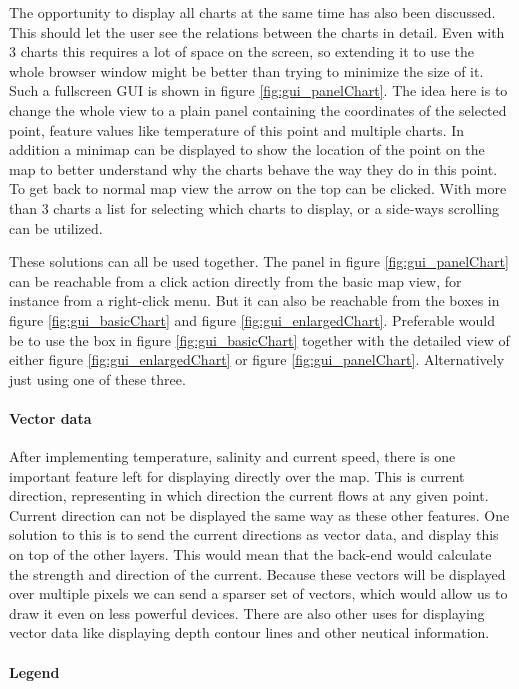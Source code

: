 \documentclass[11pt,a4paper,titlepage,oneside]{report}
\begin{document}
The opportunity to display all charts at the same time has also been discussed. This should let the user see the relations between the charts in detail. Even with 3 charts this requires a lot of space on the screen, so extending it to use the whole browser window might be better than trying to minimize the size of it. Such a fullscreen \gls{GUI} is shown in figure \ref{fig:gui_panelChart}. The idea here is to change the whole view to a plain panel containing the coordinates of the selected point, feature values like temperature of this point and multiple charts. In addition a minimap can be displayed to show the location of the point on the map to better understand why the charts behave the way they do in this point. To get back to normal map view the arrow on the top can be clicked. With more than 3 charts a list for selecting which charts to display, or a side-ways scrolling can be utilized.

These solutions can all be used together. The panel in figure \ref{fig:gui_panelChart} can be reachable from a click action directly from the basic map view, for instance from a right-click menu. But it can also be reachable from the boxes in figure \ref{fig:gui_basicChart} and figure \ref{fig:gui_enlargedChart}. Preferable would be to use the box in figure \ref{fig:gui_basicChart} together with the detailed view of either figure \ref{fig:gui_enlargedChart} or figure \ref{fig:gui_panelChart}. Alternatively just using one of these three.

\paragraph{Vector data}
After implementing temperature, salinity and current speed, there is one important feature left for displaying directly over the map. This is current direction, representing in which direction the current flows at any given point. Current direction can not be displayed the same way as these other features. One solution to this is to send the current directions as vector data, and display this on top of the other layers. This would mean that the \gls{back-end} would calculate the strength and direction of the current. Because these vectors will be displayed over multiple pixels we can send a sparser set of vectors, which would allow us to draw it even on less powerful devices.
There are also other uses for displaying vector data like displaying depth contour lines and other neutical information.

\paragraph{Legend}
\end{document}

